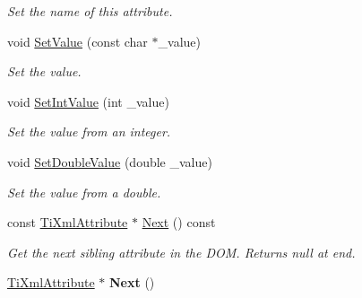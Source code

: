 \begin{DoxyCompactItemize}
\begin{DoxyCompactList}\small\item\em Set the name of this attribute. \end{DoxyCompactList}\item 
\hypertarget{class_ti_xml_attribute_a2dae44178f668b3cb48101be4f2236a0}{void \hyperlink{class_ti_xml_attribute_a2dae44178f668b3cb48101be4f2236a0}{Set\+Value} (const char $\ast$\+\_\+value)}\label{class_ti_xml_attribute_a2dae44178f668b3cb48101be4f2236a0}

\begin{DoxyCompactList}\small\item\em Set the value. \end{DoxyCompactList}\item 
\hypertarget{class_ti_xml_attribute_a7e065df640116a62ea4f4b7da5449cc8}{void \hyperlink{class_ti_xml_attribute_a7e065df640116a62ea4f4b7da5449cc8}{Set\+Int\+Value} (int \+\_\+value)}\label{class_ti_xml_attribute_a7e065df640116a62ea4f4b7da5449cc8}

\begin{DoxyCompactList}\small\item\em Set the value from an integer. \end{DoxyCompactList}\item 
\hypertarget{class_ti_xml_attribute_a0316da31373496c4368ad549bf711394}{void \hyperlink{class_ti_xml_attribute_a0316da31373496c4368ad549bf711394}{Set\+Double\+Value} (double \+\_\+value)}\label{class_ti_xml_attribute_a0316da31373496c4368ad549bf711394}

\begin{DoxyCompactList}\small\item\em Set the value from a double. \end{DoxyCompactList}\item 
\hypertarget{class_ti_xml_attribute_a776478980776a024f7c2846eec640f65}{const \hyperlink{class_ti_xml_attribute}{Ti\+Xml\+Attribute} $\ast$ \hyperlink{class_ti_xml_attribute_a776478980776a024f7c2846eec640f65}{Next} () const }\label{class_ti_xml_attribute_a776478980776a024f7c2846eec640f65}

\begin{DoxyCompactList}\small\item\em Get the next sibling attribute in the D\+O\+M. Returns null at end. \end{DoxyCompactList}\item 
\hypertarget{class_ti_xml_attribute_a138320aa7793b148ba7e5bd0a0ea4db6}{\hyperlink{class_ti_xml_attribute}{Ti\+Xml\+Attribute} $\ast$ {\bfseries Next} ()}\label{class_ti_xml_attribute_a138320aa7793b148ba7e5bd0a0ea4db6}


\end{DoxyCompactItemize}
